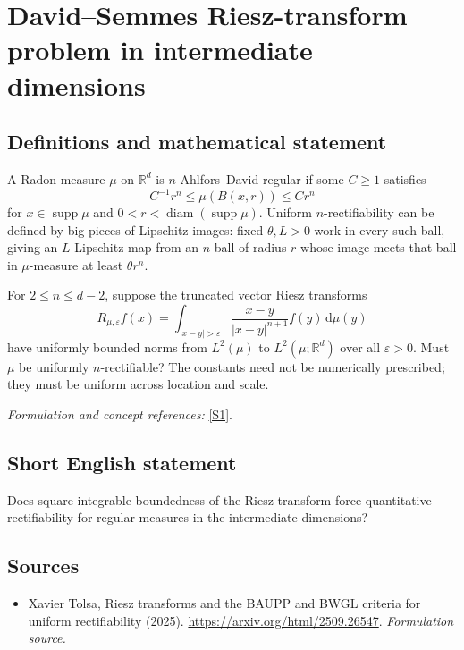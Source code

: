 \documentclass[11pt]{article}
\begin{document}
\section*{\texorpdfstring{David–Semmes Riesz-transform problem in intermediate dimensions}{David–Semmes Riesz-transform problem in intermediate dimensions}}\label{30006957}
\subsection{Definitions and mathematical statement}
A Radon measure $\mu$ on ${\mathbb{R}}^d$ is $n$-Ahlfors--David regular if some $C\ge1$ satisfies
\[
 C^{-1}r^n\le\mu(B(x,r))\le Cr^n
\]
for $x\in\operatorname{supp}\mu$ and $0<r<\operatorname{diam}(\operatorname{supp}\mu)$. Uniform $n$-rectifiability can be defined by big pieces of Lipschitz images: fixed $\theta,L>0$ work in every such ball, giving an $L$-Lipschitz map from an $n$-ball of radius $r$ whose image meets that ball in $\mu$-measure at least $\theta r^n$.

For $2\le n\le d-2$, suppose the truncated vector Riesz transforms
\[
 R_{\mu,{\varepsilon}}f(x)=\int_{|x-y|>{\varepsilon}}
 \frac{x-y}{|x-y|^{n+1}}f(y){\,\mathrm{d}}\mu(y)
\]
have uniformly bounded norms from $L^2(\mu)$ to $L^2(\mu;{\mathbb{R}}^d)$ over all ${\varepsilon}>0$. Must $\mu$ be uniformly $n$-rectifiable? The constants need not be numerically prescribed; they must be uniform across location and scale.
\par\smallskip\textit{Formulation and concept references:} \href{https://arxiv.org/html/2509.26547}{[S1]}.

\subsection{Short English statement}
Does square-integrable boundedness of the Riesz transform force quantitative rectifiability for regular measures in the intermediate dimensions?
\subsection{Sources}
\begin{itemize}
\item[S1]Xavier Tolsa, Riesz transforms and the BAUPP and BWGL criteria for uniform rectifiability (2025).
\url{https://arxiv.org/html/2509.26547}.
\textit{Formulation source.}
\end{itemize}
\end{document}
